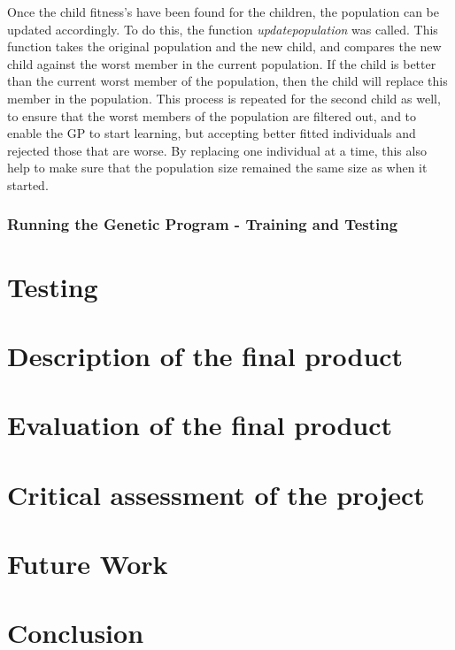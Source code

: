 \documentclass[11pt]{article}
\begin{document}
Once the child fitness's have been found for the children, the population can be updated accordingly. To do this, the function \textit{update\textunderscore population} was called. This function takes the original population and the new child, and compares the new child against the worst member in the current population. If the child is better than the current worst member of the population, then the child will replace this member in the population. This process is repeated for the second child as well, to ensure that the worst members of the population are filtered out, and to enable the GP to start learning, but accepting better fitted individuals and rejected those that are worse. By replacing one individual at a time, this also help to make sure that the population size remained the same size as when it started. 


\subsubsection{Running the Genetic Program - Training and Testing}
\newpage
\section{Testing}

\newpage
\section{Description of the final product}

\newpage
\section{Evaluation of the final product}

\newpage
\section{Critical assessment of the project }

\newpage
\section{Future Work}

\newpage
\section{Conclusion}
\end{document}
